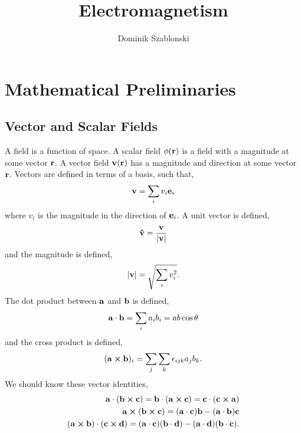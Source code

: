 \documentclass{book}
\title{Electromagnetism}
\author{Dominik Szablonski}
\begin{document}
\maketitle

\tableofcontents

\chapter{Mathematical Preliminaries}
\section{Vector and Scalar Fields}
A field is a function of space. A scalar field $\phi(\vb{r})$ is a field with a magnitude at some vector $\vb{r}$. A vector field $\vb{v}(\vb{r})$ has a magnitude and direction at some vector $\vb{r}$. Vectors are defined in terms of a basis, such that,
\begin{equation}
	\vb{v} = \sum_i v_i \vb{e}_i
\end{equation}
where $v_i$ is the magnitude in the direction of $\vb{e}_i$. A unit vector is defined,
\begin{equation}
	\vu{v} = \frac{\vb{v}}{|\vb{v}|}
\end{equation}
and the magnitude is defined,
\begin{equation}
	|\vb{v}| = \sqrt{\sum_i v_i^2}.
\end{equation}
The dot product between $\vb{a}$ and $\vb{b}$ is defined,
\begin{equation}
	\vb{a} \cdot \vb{b} = \sum_i a_ib_i = ab\cos\theta
\end{equation}
and the cross product is defined,
\begin{equation}
	(\vb{a}\cross\vb{b})_i = \sum_j\sum_k\epsilon_{ijk}a_jb_k.
\end{equation}
We should know these vector identities,
\begin{align}
	\vb{a}\cdot(\vb{b}\cross\vb{c}) = \vb{b}\cdot(\vb{a}\cross\vb{c}) = \vb{c}\cdot(\vb{c}\cross\vb{a}) \\
	\vb{a}\cross(\vb{b}\cross\vb{c}) = (\vb{a}\cdot\vb{c})\vb{b} - (\vb{a}\cdot\vb{b})\vb{c} \\
	(\vb{a}\cross\vb{b})\cdot(\vb{c}\cross\vb{d}) = (\vb{a}\cdot\vb{c})(\vb{b}\cdot\vb{d})-(\vb{a}\cdot\vb{d})(\vb{b}\cdot\vb{c}).
\end{align}
\end{document}
